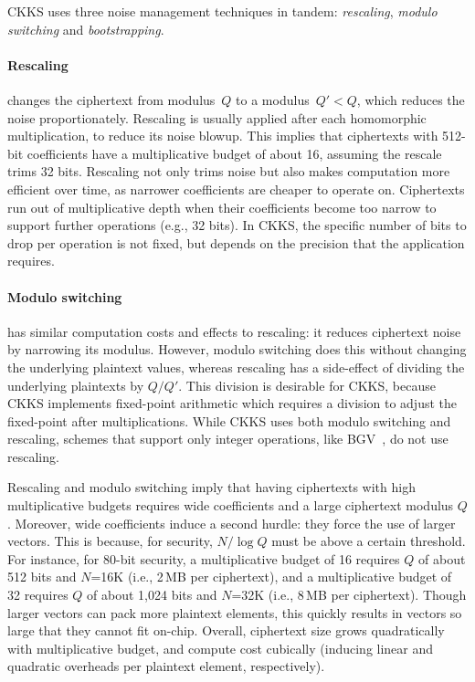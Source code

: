 CKKS uses three noise management techniques in tandem: \emph{rescaling},
\emph{modulo switching} and \emph{bootstrapping}.


\paragraph{Rescaling} changes the ciphertext from modulus~$Q$ to a modulus~$Q'
< Q$, which reduces the noise proportionately. Rescaling is usually applied
after each homomorphic multiplication, to reduce its noise blowup. This implies
that ciphertexts with 512-bit coefficients have a multiplicative budget of
about 16, assuming the rescale trims 32 bits. Rescaling not only trims noise
but also makes computation more efficient over time, as narrower coefficients
are cheaper to operate on. Ciphertexts run out of multiplicative depth when
their coefficients become too narrow to support further operations (e.g., 32
bits). In CKKS, the specific number of bits to drop per operation is not fixed,
but depends on the precision that the application requires.

\paragraph{Modulo switching} has similar computation costs and effects to
rescaling: it reduces ciphertext noise by narrowing its modulus. However,
modulo switching does this without changing the underlying plaintext values,
whereas rescaling has a side-effect of dividing the underlying plaintexts by
$Q/Q'$. This division is desirable for CKKS, because CKKS implements
fixed-point arithmetic which requires a division to adjust the fixed-point
after multiplications. While CKKS uses both modulo switching and rescaling,
schemes that support only integer operations, like
BGV~\cite{brakerski:toct14:leveled}, do not use rescaling.

Rescaling and modulo switching imply that having ciphertexts with high
multiplicative budgets requires wide coefficients and a large ciphertext
modulus $Q$. Moreover, wide coefficients induce a second hurdle: they force the
use of larger vectors. This is because, for security, $N/\log Q$ must be above
a certain threshold. For instance, for 80-bit security, a multiplicative budget
of 16 requires $Q$ of about 512 bits and $N$=16K (i.e., 2\,MB per ciphertext),
and a multiplicative budget of 32 requires $Q$ of about 1,024 bits and $N$=32K
(i.e., 8\,MB per ciphertext). Though larger vectors can pack more plaintext
elements, this quickly results in vectors so large that they cannot fit
on-chip. Overall, ciphertext size grows quadratically with multiplicative
budget, and compute cost cubically (inducing linear and quadratic overheads per
plaintext element, respectively).


